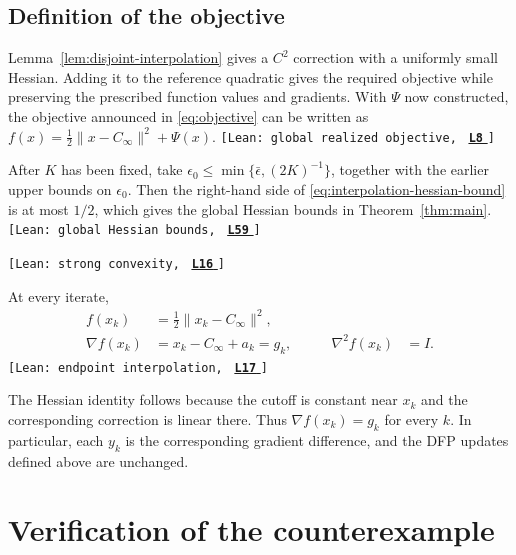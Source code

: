 \documentclass[11pt]{article}
\newcommand{\leanLinkText}[1]{%
  \underline{\textbf{#1}}%
}
\newcommand{\leanSnapshot}{e308927f5b7930bdd002f0c0e42b9d112ad821cb}
\newcommand{\leanClaimTag}[3]{%
  {\footnotesize\texttt{[Lean: #1, }}%
  \href{https://github.com/imathwy/DFP_wolfe_local/blob/\leanSnapshot/#2?plain=1\#L#3}%
    {\leanLinkText{\footnotesize\texttt{L#3}}}%
  {\footnotesize\texttt{]}}\enspace
}
\begin{document}
\subsection{Definition of the objective}

Lemma~\ref{lem:disjoint-interpolation} gives a $C^2$ correction with a
uniformly small Hessian.  Adding it to the reference quadratic gives the
required objective while preserving the prescribed function values and
gradients.  With $\Psi$ now constructed, the objective announced in
\eqref{eq:objective} can be written as
$f(x)=\frac12\|x-C_\infty\|^2+\Psi(x)$.
\leanClaimTag{global realized objective}{DFPWolfe/A_uniformly_convex_counterexample_to_global_convergence_of_DFP_under_weak_Wolfe_/Definition_5_11_Global_realized_objective.lean}{8}
After $K$ has been fixed, take
$\epsilon_0\le\min\{\bar\epsilon,(2K)^{-1}\}$, together with the earlier
upper bounds on $\epsilon_0$.  Then the right-hand side of
\eqref{eq:interpolation-hessian-bound} is at most $1/2$, which gives the global
Hessian bounds in Theorem~\ref{thm:main}.
\leanClaimTag{global Hessian bounds}{DFPWolfe/A_uniformly_convex_counterexample_to_global_convergence_of_DFP_under_weak_Wolfe_/Proposition_5_12a_Global_Hessian_bounds.lean}{59}
\leanClaimTag{strong convexity}{DFPWolfe/A_uniformly_convex_counterexample_to_global_convergence_of_DFP_under_weak_Wolfe_/Corollary_5_12b_Global_strong_and_uniform_convexity.lean}{16}
At every iterate,
\begin{equation}\label{eq:endpoint-data}
\begin{aligned}
f(x_k)&=\frac12\|x_k-C_\infty\|^2,\\
\nabla f(x_k)&=x_k-C_\infty+a_k=g_k,
&\qquad \nabla^2f(x_k)&=I.
\end{aligned}
\end{equation}
\leanClaimTag{endpoint interpolation}{DFPWolfe/A_uniformly_convex_counterexample_to_global_convergence_of_DFP_under_weak_Wolfe_/Proposition_5_13_Exact_endpoint_value_and_gradient_interpolation.lean}{17}
The Hessian identity follows because the cutoff is constant near $x_k$ and
the corresponding correction is linear there.  Thus
$\nabla f(x_k)=g_k$ for every $k$.  In particular, each $y_k$ is the
corresponding gradient difference, and the DFP updates defined above are
unchanged.

\section{Verification of the counterexample}
\label{sec:completion}
\end{document}
